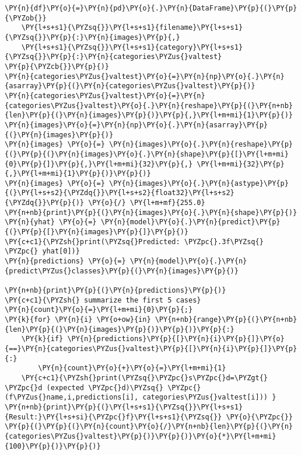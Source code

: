 \begin{tcolorbox}[breakable, size=fbox, boxrule=1pt, pad at break*=1mm,colback=cellbackground, colframe=cellborder]
\begin{Verbatim}[commandchars=\\\{\}]
\PY{n}{df}\PY{o}{=}\PY{n}{pd}\PY{o}{.}\PY{n}{DataFrame}\PY{p}{(}\PY{p}{\PYZob{}}
    \PY{l+s+s1}{\PYZsq{}}\PY{l+s+s1}{filename}\PY{l+s+s1}{\PYZsq{}}\PY{p}{:}\PY{n}{images}\PY{p}{,}
    \PY{l+s+s1}{\PYZsq{}}\PY{l+s+s1}{category}\PY{l+s+s1}{\PYZsq{}}\PY{p}{:}\PY{n}{categories\PYZus{}valtest}
\PY{p}{\PYZcb{}}\PY{p}{)}
\PY{n}{categories\PYZus{}valtest}\PY{o}{=}\PY{n}{np}\PY{o}{.}\PY{n}{asarray}\PY{p}{(}\PY{n}{categories\PYZus{}valtest}\PY{p}{)}
\PY{n}{categories\PYZus{}valtest}\PY{o}{=}\PY{n}{categories\PYZus{}valtest}\PY{o}{.}\PY{n}{reshape}\PY{p}{(}\PY{n+nb}{len}\PY{p}{(}\PY{n}{images}\PY{p}{)}\PY{p}{,}\PY{l+m+mi}{1}\PY{p}{)}
\PY{n}{images}\PY{o}{=}\PY{n}{np}\PY{o}{.}\PY{n}{asarray}\PY{p}{(}\PY{n}{images}\PY{p}{)}
\PY{n}{images} \PY{o}{=} \PY{n}{images}\PY{o}{.}\PY{n}{reshape}\PY{p}{(}\PY{p}{(}\PY{n}{images}\PY{o}{.}\PY{n}{shape}\PY{p}{[}\PY{l+m+mi}{0}\PY{p}{]}\PY{p}{,}\PY{l+m+mi}{32}\PY{p}{,} \PY{l+m+mi}{32}\PY{p}{,}\PY{l+m+mi}{1}\PY{p}{)}\PY{p}{)}
\PY{n}{images} \PY{o}{=} \PY{n}{images}\PY{o}{.}\PY{n}{astype}\PY{p}{(}\PY{l+s+s2}{\PYZdq{}}\PY{l+s+s2}{float32}\PY{l+s+s2}{\PYZdq{}}\PY{p}{)} \PY{o}{/} \PY{l+m+mf}{255.0}
\PY{n+nb}{print}\PY{p}{(}\PY{n}{images}\PY{o}{.}\PY{n}{shape}\PY{p}{)}
\PY{n}{yhat} \PY{o}{=} \PY{n}{model}\PY{o}{.}\PY{n}{predict}\PY{p}{(}\PY{p}{[}\PY{n}{images}\PY{p}{]}\PY{p}{)}
\PY{c+c1}{\PYZsh{}print(\PYZsq{}Predicted: \PYZpc{}.3f\PYZsq{} \PYZpc{} yhat[0])}
\PY{n}{predictions} \PY{o}{=} \PY{n}{model}\PY{o}{.}\PY{n}{predict\PYZus{}classes}\PY{p}{(}\PY{n}{images}\PY{p}{)}

\PY{n+nb}{print}\PY{p}{(}\PY{n}{predictions}\PY{p}{)}
\PY{c+c1}{\PYZsh{} summarize the first 5 cases}
\PY{n}{count}\PY{o}{=}\PY{l+m+mi}{0}\PY{p}{;}
\PY{k}{for} \PY{n}{i} \PY{o+ow}{in} \PY{n+nb}{range}\PY{p}{(}\PY{n+nb}{len}\PY{p}{(}\PY{n}{images}\PY{p}{)}\PY{p}{)}\PY{p}{:}
    \PY{k}{if} \PY{n}{predictions}\PY{p}{[}\PY{n}{i}\PY{p}{]}\PY{o}{==}\PY{n}{categories\PYZus{}valtest}\PY{p}{[}\PY{n}{i}\PY{p}{]}\PY{p}{:}
        \PY{n}{count}\PY{o}{+}\PY{o}{=}\PY{l+m+mi}{1}
    \PY{c+c1}{\PYZsh{}print(\PYZsq{}\PYZpc{}s\PYZpc{}d=\PYZgt{} \PYZpc{}d (expected \PYZpc{}d)\PYZsq{} \PYZpc{} (f\PYZus{}name,i,predictions[i], categories\PYZus{}valtest[i])) }
\PY{n+nb}{print}\PY{p}{(}\PY{l+s+s1}{\PYZsq{}}\PY{l+s+s1}{Result:}\PY{l+s+si}{\PYZpc{}f}\PY{l+s+s1}{\PYZsq{}} \PY{o}{\PYZpc{}} \PY{p}{(}\PY{p}{(}\PY{n}{count}\PY{o}{/}\PY{n+nb}{len}\PY{p}{(}\PY{n}{categories\PYZus{}valtest}\PY{p}{)}\PY{p}{)}\PY{o}{*}\PY{l+m+mi}{100}\PY{p}{)}\PY{p}{)}   
   
\end{Verbatim}
\end{tcolorbox}

